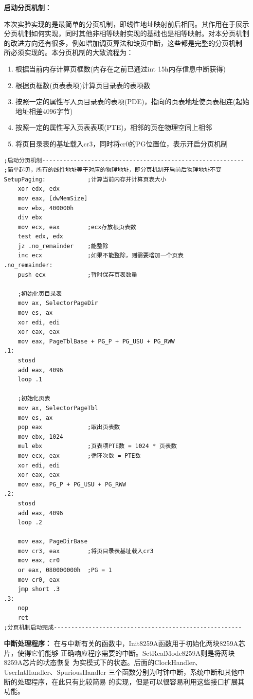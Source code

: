 \documentclass[12pt,a4paper,UTF8]{ctexart}
\begin{document}
\textbf{启动分页机制：}

本次实验实现的是最简单的分页机制，即线性地址映射前后相同。其作用在于展示
分页机制如何实现，同时其他非相等映射实现的基础也是相等映射。对本分页机制
的改进方向还有很多，例如增加调页算法和缺页中断，这些都是完整的分页机制
所必须实现的。本分页机制的大致流程为：

\begin{enumerate}
\item 根据当前内存计算页框数(内存在之前已通过int 15h内存信息中断获得)
\item 根据页框数(页表表项)计算页目录表的表项数
\item 按照一定的属性写入页目录表的表项(PDE)，指向的页表地址使页表相连(起始地址相差4096字节)
\item 按照一定的属性写入页表表项(PTE)，相邻的页在物理空间上相邻
\item 将页目录表的基址载入cr3，同时将cr0的PG位置位，表示开启分页机制
\end{enumerate}

\begin{lstlisting}
;启动分页机制----------------------------------------------------------
;简单起见，所有的线性地址等于对应的物理地址，即分页机制开启前后物理地址不变
SetupPaging:            ;计算当前内存并计算页表大小
    xor edx, edx
    mov eax, [dwMemSize]
    mov ebx, 400000h
    div ebx
    mov ecx, eax        ;ecx存放根页表数
    test edx, edx
    jz .no_remainder    ;能整除
    inc ecx             ;如果不能整除，则需要增加一个页表
.no_remainder:
    push ecx            ;暂时保存页表数量

    ;初始化页目录表
    mov ax, SelectorPageDir
    mov es, ax
    xor edi, edi
    xor eax, eax
    mov eax, PageTblBase + PG_P + PG_USU + PG_RWW
.1:
    stosd
    add eax, 4096
    loop .1

    ;初始化页表
    mov ax, SelectorPageTbl
    mov es, ax
    pop eax             ;取出页表数
    mov ebx, 1024
    mul ebx             ;页表项PTE数 = 1024 * 页表数
    mov ecx, eax        ;循环次数 = PTE数
    xor edi, edi
    xor eax, eax
    mov eax, PG_P + PG_USU + PG_RWW
.2:
    stosd
    add eax, 4096
    loop .2

    mov eax, PageDirBase
    mov cr3, eax        ;将页目录表基址载入cr3
    mov eax, cr0
    or eax, 080000000h  ;PG = 1
    mov cr0, eax
    jmp short .3
.3:
    nop
    ret
;分页机制启动完成------------------------------------------------------
\end{lstlisting}

\textbf{中断处理程序：}
在与中断有关的函数中，Init8259A函数用于初始化两块8259A芯片，使得它们能够
正确响应程序需要的中断。SetRealMode8259A则是将两块8259A芯片的状态恢复
为实模式下的状态。后面的ClockHandler、UserIntHandler、SpuriousHandler
三个函数分别为时钟中断，系统中断和其他中断的处理程序，在此只有比较简易
的实现，但是可以很容易利用这些接口扩展其功能。
\end{document}
